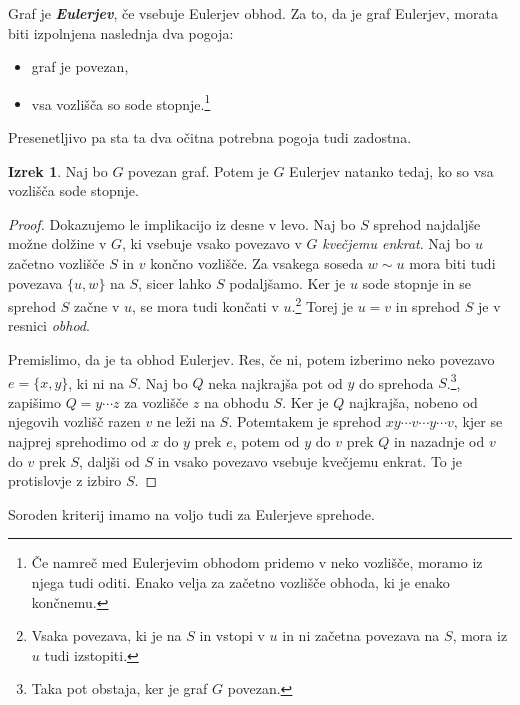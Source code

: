 \documentclass[11pt]{book}
\def\definicija{\color{rdeca}\bf\em}
\theoremstyle{definition}
\theoremstyle{zgled}
\theoremstyle{odprtproblem}
\theoremstyle{domacanaloga}
\newenvironment{dokaz}
    {\color{siva}\begin{proof}}
    {\end{proof}}
\theoremstyle{izrek}
\newtheorem*{izrek}{Izrek}
\begin{document}
Graf je {\definicija Eulerjev}, če vsebuje Eulerjev obhod. Za to, da je graf Eulerjev, morata biti izpolnjena naslednja dva pogoja:
\begin{itemize}
    \item graf je povezan,
    \item vsa vozlišča so sode stopnje.\footnote{Če namreč med Eulerjevim obhodom pridemo v neko vozlišče, moramo iz njega tudi oditi. Enako velja za začetno vozlišče obhoda, ki je enako končnemu.}
\end{itemize}

Presenetljivo pa sta ta dva očitna potrebna pogoja tudi zadostna.

\begin{izrek}
    Naj bo $G$ povezan graf. Potem je $G$ Eulerjev natanko tedaj, ko so vsa vozlišča sode stopnje.
\end{izrek}
\begin{dokaz}
Dokazujemo le implikacijo iz desne v levo. Naj bo $S$ sprehod najdaljše možne dolžine v $G$, ki vsebuje vsako povezavo v $G$ \emph{kvečjemu enkrat}. Naj bo $u$ začetno vozlišče $S$ in $v$ končno vozlišče. Za vsakega soseda $w \sim u$ mora biti tudi povezava $\{ u, w \}$ na $S$, sicer lahko $S$ podaljšamo. Ker je $u$ sode stopnje in se sprehod $S$ začne v $u$, se mora tudi končati v $u$.\footnote{Vsaka povezava, ki je na $S$ in vstopi v $u$ in ni začetna povezava na $S$, mora iz $u$ tudi izstopiti.} Torej je $u = v$ in sprehod $S$ je v resnici \emph{obhod}. 

Premislimo, da je ta obhod Eulerjev. Res, če ni, potem izberimo neko povezavo $e = \{ x, y \}$, ki ni na $S$. Naj bo $Q$ neka najkrajša pot od $y$ do sprehoda $S$.\footnote{Taka pot obstaja, ker je graf $G$ povezan.}, zapišimo $Q = y \cdots z$ za vozlišče $z$ na obhodu $S$. Ker je $Q$ najkrajša, nobeno od njegovih vozlišč razen $v$ ne leži na $S$. Potemtakem je sprehod $xy \cdots v \cdots y \cdots v$, kjer se najprej sprehodimo od $x$ do $y$ prek $e$, potem od $y$ do $v$ prek $Q$ in nazadnje od $v$ do $v$ prek $S$, daljši od $S$ in vsako povezavo vsebuje kvečjemu enkrat. To je protislovje z izbiro $S$.
\end{dokaz}

Soroden kriterij imamo na voljo tudi za Eulerjeve sprehode.
\end{document}
